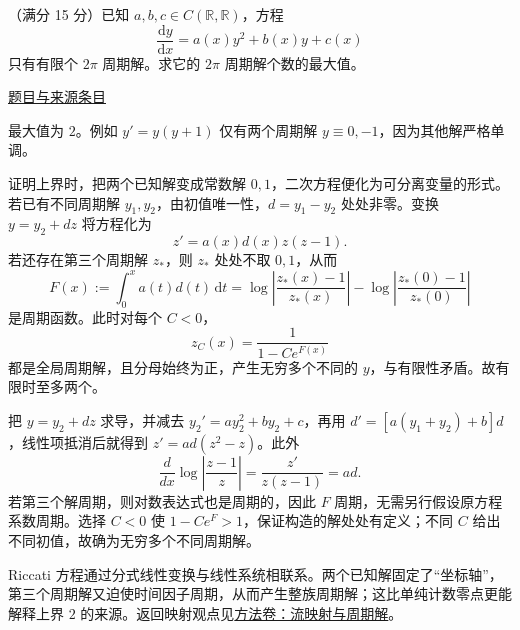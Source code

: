 \documentclass[12pt,fontset=fandol]{ctexart}
\begin{document}
\begin{example}\label{ex:fin10-lo:9}\label{pr:fin10-lo:9}

（满分 15 分）已知 $a,b,c\in C(\mathbb{R},\mathbb{R})$，方程
\[
\frac{\mathrm{d}y}{\mathrm{d}x}=a(x)y^{2}+b(x)y+c(x)
\]
只有有限个 $2\pi$ 周期解。求它的 $2\pi$ 周期解个数的最大值。

\par\href{https://github.com/lzxcr/cmc-mathematics/blob/64916fa1fdbc3e444a652eca204d5669058ee321/src/problems/finals/10/10.md}{题目与来源条目}

\end{example}

\begin{solve}\label{ans:fin10-lo:9}

最大值为 $2$。例如 $y'=y(y+1)$ 仅有两个周期解 $y\equiv0,-1$，因为其他解严格单调。

证明上界时，把两个已知解变成常数解 $0,1$，二次方程便化为可分离变量的形式。若已有不同周期解 $y_1,y_2$，由初值唯一性，$d=y_1-y_2$ 处处非零。变换 $y=y_2+dz$ 将方程化为
\[
z'=a(x)d(x)z(z-1).
\]
若还存在第三个周期解 $z_*$，则 $z_*$ 处处不取 $0,1$，从而
\[
F(x):=\int_0^xa(t)d(t)\,\mathrm dt
=\log\left|\frac{z_*(x)-1}{z_*(x)}\right|-\log\left|\frac{z_*(0)-1}{z_*(0)}\right|
\]
是周期函数。此时对每个 $C<0$，
\[
z_C(x)=\frac1{1-Ce^{F(x)}}
\]
都是全局周期解，且分母始终为正，产生无穷多个不同的 $y$，与有限性矛盾。故有限时至多两个。

把 $y=y_2+dz$ 求导，并减去 $y_2'=ay_2^2+by_2+c$，再用 $d'=[a(y_1+y_2)+b]d$，线性项抵消后就得到 $z'=ad(z^2-z)$。此外
\[
\frac{d}{dx}\log\left|\frac{z-1}{z}\right|=\frac{z'}{z(z-1)}=ad.
\]
若第三个解周期，则对数表达式也是周期的，因此 $F$ 周期，无需另行假设原方程系数周期。选择 $C<0$ 使 $1-Ce^F>1$，保证构造的解处处有定义；不同 $C$ 给出不同初值，故确为无穷多个不同周期解。

\end{solve}

\begin{remark}[方法与条件]Riccati 方程通过分式线性变换与线性系统相联系。两个已知解固定了“坐标轴”，第三个周期解又迫使时间因子周期，从而产生整族周期解；这比单纯计数零点更能解释上界 $2$ 的来源。返回映射观点见\hyperref[app:dynamics-flow]{方法卷：流映射与周期解}。\end{remark}
\end{document}
